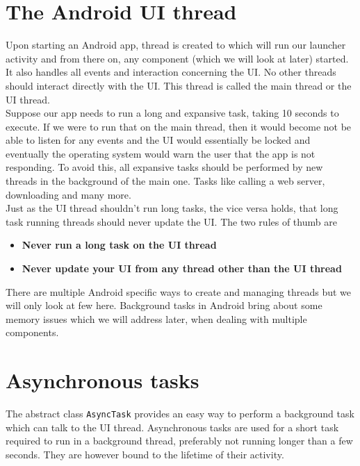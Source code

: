 \section{The Android UI thread}
Upon starting an Android app, thread is created to which will run our launcher activity and from there on, any component (which we will look at later) started. It also handles all events and interaction concerning the UI. No other threads should interact directly with the UI. This thread is called the main thread or the UI thread.\\

Suppose our app needs to run a long and expansive task, taking 10 seconds to execute. If we were to run that on the main thread, then it would become not be able to listen for any events and the UI would essentially be locked and eventually the operating system would warn the user that the app is not responding. To avoid this, all expansive tasks should be performed by new threads in the background of the main one. Tasks like calling a web server, downloading and many more.\\

Just as the UI thread shouldn't run long tasks, the vice versa holds, that long task running threads should never update the UI. The two rules of thumb are
\begin{itemize}
\item \textbf{Never run a long task on the UI thread}
\item \textbf{Never update your UI from any thread other than the UI thread}
\end{itemize}

There are multiple Android specific ways to create and managing threads but we will only look at few here. Background tasks in Android bring about some memory issues which we will address later, when dealing with multiple components.

\section{Asynchronous tasks}
The abstract class \texttt{AsyncTask} provides an easy way to perform a background task which can talk to the UI thread. Asynchronous tasks are used for a short task required to run in a background thread, preferably not running longer than a few seconds. They are however bound to the lifetime of their activity.\\

